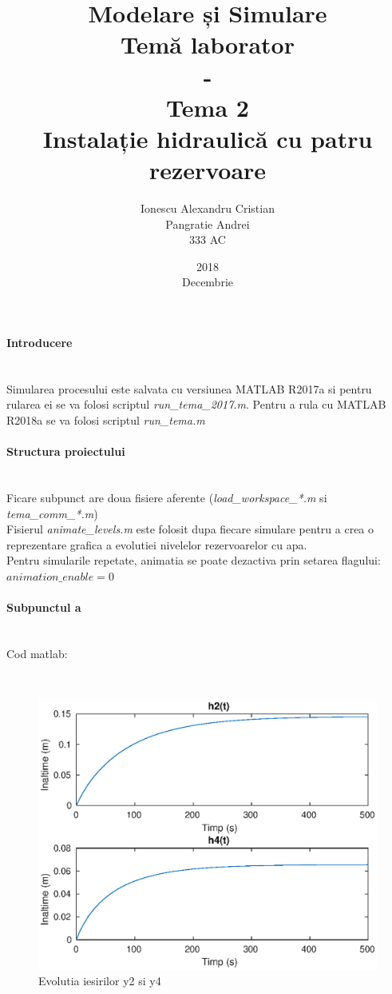\documentclass[12pt,english]{article}
\title{Modelare și Simulare\\Temă laborator\\-\\Tema 2\\Instalație hidraulică cu patru rezervoare}
\date{2018\\Decembrie}
\author{Ionescu Alexandru Cristian\\Pangratie Andrei\\333 AC}
\newcommand{\myparagraph}[1]{\paragraph{#1}\mbox{}\\}
\begin{document}
\maketitle

\pagebreak


\myparagraph {Introducere}
Simularea procesului este salvata cu versiunea MATLAB R2017a si pentru rularea ei se va folosi scriptul \textit{run\_tema\_2017.m}. Pentru a rula cu MATLAB R2018a se va folosi scriptul \textit{run\_tema.m}

\myparagraph {Structura proiectului}
Ficare subpunct are doua fisiere aferente (\textit{load\_workspace\_*.m} si \textit{tema\_comm\_*.m}) \\
Fisierul \textit{animate\_levels.m} este folosit dupa fiecare simulare pentru a crea o reprezentare grafica a evolutiei nivelelor rezervoarelor cu apa.\\
Pentru simularile repetate, animatia se poate dezactiva prin setarea flagului: $animation\_enable = 0$



\myparagraph {Subpunctul a}
Cod matlab:
\begin{verbatim}
	
\end{verbatim}

\begin{center}
	\begin{figure} [htbp]
		\includegraphics[width=1\textwidth]{a_2.eps}
		\caption{Evolutia iesirilor y2 si y4}
	\end{figure}
\end{center}
\end{document}
